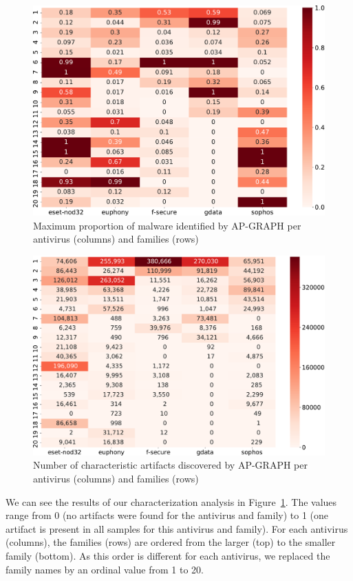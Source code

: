 \begin{figure}[!ht]
        \centering
	\includegraphics[width=0.85\linewidth]{figures/apgraph/selected.pdf}
        \caption[Maximum proportion of malware identified by AP-GRAPH]{Maximum proportion of malware identified by AP-GRAPH per antivirus (columns) and families (rows)}
	\label{figure:apgraph:char}
\end{figure}

\begin{figure}[!ht]
        \centering
	\includegraphics[width=0.85\linewidth]{figures/apgraph/uncovered.pdf}
        \caption[Number of characteristic artifacts discovered by AP-GRAPH]{Number of characteristic artifacts discovered by AP-GRAPH per antivirus (columns) and families (rows)}
	\label{figure:apgraph:count}
\end{figure}

We can see the results of our characterization analysis in Figure~\ref{figure:apgraph:char}.
The values range from 0 (no artifacts were found for the antivirus and family) to 1 (one artifact is present in all samples for this antivirus and family).
For each antivirus (columns), the families (rows) are ordered from the larger (top) to the smaller family (bottom).
As this order is different for each antivirus, we replaced the family names by an ordinal value from 1 to 20.

